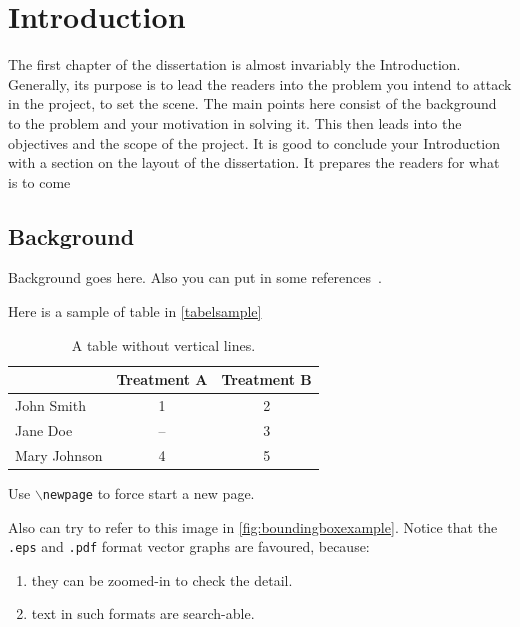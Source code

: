 
\chapter{Introduction}
\begin{spacing}{1.5}
\setlength{\parskip}{0.3in}

The first chapter of the dissertation is almost invariably the Introduction. Generally, its purpose is to lead the readers into the problem you intend to attack in the project, to set the scene. The main points here consist of the background to the problem and your motivation in solving it. This then leads into the objectives and the scope of the project. It is good to conclude your Introduction with a section on the layout of the dissertation. It prepares the readers for what is to come

\section{Background}


Background goes here. Also you can put in some references~\cite{ronneberger2015unet}.

Here is a sample of table in \autoref{tabelsample}

\begin{table}[ht]
\centering
\caption{A table without vertical lines.}
\label{tabelsample}
\begin{tabular}[t]{lcc}
\toprule
&Treatment A&Treatment B\\
\midrule
John Smith&1&2\\
Jane Doe&--&3\\
Mary Johnson&4&5\\
\bottomrule
\end{tabular}
\end{table}%

Use  \texttt{$\backslash$newpage} to force start a new page.

\newpage

Also can try to refer to this image in \autoref{fig:boundingboxexample}. Notice that the \texttt{.eps} and \texttt{.pdf} format vector graphs are favoured, because:

\begin{enumerate}
    \item they can be zoomed-in to check the detail.
    \item text in such formats are search-able.
\end{enumerate}



\end{spacing}
